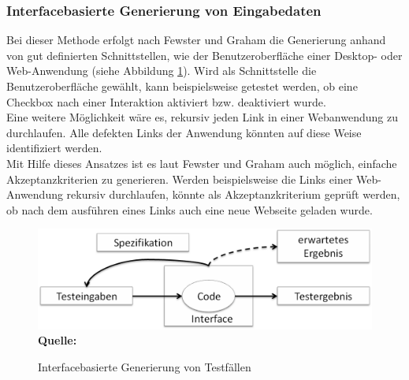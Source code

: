 \subsubsection{Interfacebasierte Generierung von Eingabedaten}
\label{subsubsec:interfacebasierte_generierung}
Bei dieser Methode erfolgt nach Fewster und Graham \cite[vgl. S. 20]{fewster_software_1999} die Generierung anhand von gut definierten Schnittstellen, wie der Benutzeroberfläche einer Desktop- oder Web-Anwendung (siehe Abbildung \ref{fig:interfaceBasedDesign}). 
Wird als Schnittstelle die Benutzeroberfläche gewählt, kann beispielsweise getestet werden, ob eine Checkbox nach einer Interaktion aktiviert bzw. deaktiviert wurde.\\
Eine weitere Möglichkeit wäre es, rekursiv jeden Link in einer Webanwendung zu durchlaufen. Alle defekten Links der Anwendung könnten auf diese Weise identifiziert werden.\\
Mit Hilfe dieses Ansatzes ist es laut Fewster und Graham \cite[vgl. S. 21]{fewster_software_1999} auch möglich, einfache Akzeptanzkriterien zu generieren. Werden beispielsweise die Links einer Web-Anwendung rekursiv durchlaufen, könnte als Akzeptanzkriterium geprüft werden, ob nach dem ausführen eines Links auch eine neue Webseite geladen wurde.

\begin{figure}[htb]
  \centering  
  \includegraphics[scale=0.6]{img/interfaceBasedDesign.png}\\
  \footnotesize\sffamily\textbf{Quelle:} \cite[vgl. S. 20]{fewster_software_1999}
  \caption{Interfacebasierte Generierung von Testfällen}
  \label{fig:interfaceBasedDesign}
\end{figure}


